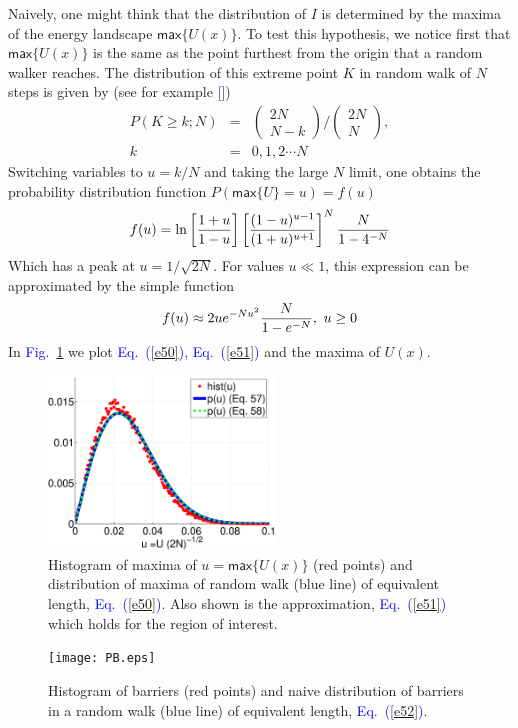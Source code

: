 \documentclass[aps,prl,floats,floatfix,twocolumn]{revtex4}
\newcommand{\mylabel}[1]{\label{#1}}
\newcommand{\beq}{\begin{eqnarray}}
\newcommand{\eeq}{\end{eqnarray}}
\newcommand{\be}[1]{\begin{eqnarray}\ifthenelse{#1=-1}
{\nonumber}{\ifthenelse{#1=0}{}{\mylabel{e#1}}}}
\newcommand{\ee}{\end{eqnarray}}
\newcommand{\Eq}[1]{\textcolor{blue}{Eq.\!\!~(\ref{#1})}}
\newcommand{\Fig}[1]{\textcolor{blue}{Fig.}\!\!~\ref{#1}}
\renewcommand{\cite}[1]{\textcolor{blue}{[\onlinecite{#1}}]} %
\begin{document}
Naively, one might think that the distribution of $I$ 
is determined by the maxima of the energy landscape $\mathsf{max}\{U(x)\}$.
To test this hypothesis, we notice first that $\mathsf{max}\{U(x)\}$ is the same as the point furthest from the origin that a random walker reaches.
The distribution of this extreme point $K$ in random walk of $N$ steps is given by (see for example \cite{dwass})
%
\beq
P(K \geq k;N) &=&  \left(\begin{array}{c}2N \\N-k\end{array}\right) / 
\left(\begin{array}{c}2N \\N\end{array}\right),  \\ 
k &=& 0,1,2\cdots N
\eeq
%
Switching variables to $u=k/N$ and taking the large $N$ limit, 
one obtains the probability distribution function $P(\mathsf{max}\{U\} =u) = f(u)$
%
\be{50}
 f(u) = \ln \left[\frac{1+u}{1-u} \right] \left[\frac{(1-u)^{u-1}}{(1+u)^{u+1}}\right]^N \frac{N}{1-4^{-N}} 
\ee
%
Which has a peak at $u=1/\sqrt{2N}$.
For values $u\ll1$, this expression can be approximated by the simple function
%
\be{51}
f(u) \approx 2ue^{-Nu^2} \frac{N}{1-e^{-N}}, \ u\geq 0
\ee
%
In \Fig{pu} we plot \Eq{e50}, \Eq{e51} and the maxima of $U(x)$.
%
\begin{figure}
\includegraphics[width=6cm]{PmaxV.eps} 
\caption{
Histogram of maxima of $u=\mathsf{max}\{U(x)\}$ (red points) and distribution of maxima of random walk (blue line) of equivalent length, \Eq{e50}. Also shown is the approximation, \Eq{e51} which holds for the region of interest.
}
\label{pu}
\end{figure}
%
\begin{figure}
\texttt{[image: PB.eps]}
\caption{
Histogram of barriers (red points) and naive distribution of barriers in a random walk (blue line) of equivalent length, \Eq{e52}. }
 \label{pb}
\end{figure}

\end{document}
